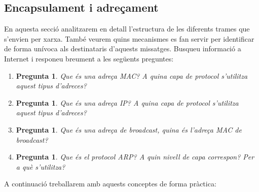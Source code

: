 \documentclass[12pt,a4paper]{article}
\newcounter{exercises}
\newtheorem{exer}[exercises]{Pregunta}
\begin{document}
\subsection{Encapsulament i adreçament}
En aquesta secció analitzarem en detall l'estructura de les diferents trames que s'envien per xarxa. També veurem quins mecanismes es fan servir per identificar de forma unívoca als destinataris d'aquests missatges. Busqueu informació a Internet i responeu breument a les següents preguntes:
\begin{enumerate}
\item \begin{exer} Que és una adreça MAC? A quina capa de protocol s'utilitza aquest tipus d'adreces? \end{exer}
\item \begin{exer} Que és una adreça IP? A quina capa de protocol s'utilitza aquest tipus d'adreces? \end{exer}
\item \begin{exer} Que és una adreça de broadcast, quina és l'adreça MAC de broadcast? \end{exer}
\item \begin{exer} Que és el protocol ARP? A quin nivell de capa correspon? Per a què s'utilitza? \end{exer}
\end{enumerate}

A continuació treballarem amb aquests conceptes de forma pràctica:
\end{document}
